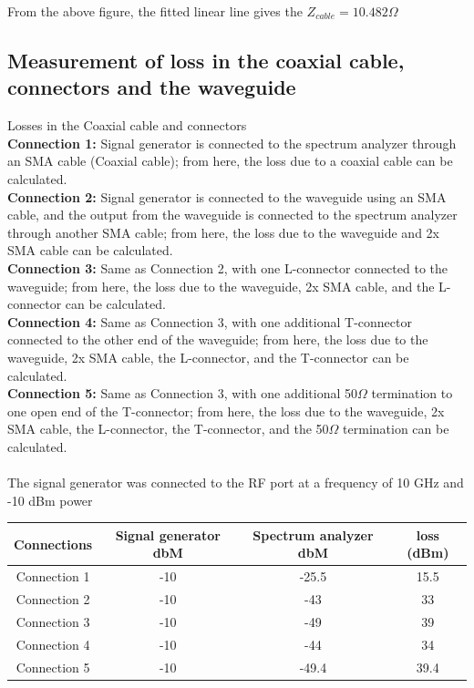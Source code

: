 \documentclass[12pt,a4paper,bold]{thesis}
\theoremstyle{thm}
\theoremstyle{definition}
\begin{document}
From the above figure, the fitted linear line gives the $Z_{cable} = 10.482 \Omega$ 
\subsection{Measurement of loss in the coaxial cable, connectors and the waveguide}
Losses in the Coaxial cable and connectors\\
\textbf{Connection 1:} Signal generator is connected to the spectrum analyzer through an SMA cable (Coaxial cable); from here, the loss due to a coaxial cable can be calculated.\\
\textbf{Connection 2:} Signal generator is connected to the waveguide using an SMA cable, and the output from the waveguide is connected to the spectrum analyzer through another SMA cable; from here, the loss due to the waveguide and 2x SMA cable can be calculated.\\ 
\textbf{Connection 3:} Same as Connection 2, with one L-connector connected to the waveguide; from here, the loss due to the waveguide, 2x SMA cable, and the L-connector can be calculated.\\
\textbf{Connection 4:} Same as Connection 3, with one additional T-connector connected to the other end of the waveguide; from here, the loss due to the waveguide, 2x SMA cable, the L-connector, and the T-connector can be calculated.\\
\textbf{Connection 5:} Same as Connection 3, with one additional 50$\Omega$ termination to one open end of the  T-connector; from here, the loss due to the waveguide, 2x SMA cable, the L-connector, the T-connector, and the 50$\Omega$ termination can be calculated.\\\\
The signal generator was connected to the RF port at a frequency of 10 GHz and -10 dBm power
\begin{center}
\begin{tabular}{||c c c c||} 
 \hline
 Connections & Signal generator dbM & Spectrum analyzer dbM & loss (dBm)\\ [0.5ex] 
 \hline\hline
 Connection 1 & -10 & -25.5 & 15.5\\ 
 Connection 2 & -10 & -43 & 33\\
 Connection 3 & -10 & -49 & 39\\
 Connection 4 & -10 & -44 & 34\\
 Connection 5 & -10 & -49.4 & 39.4\\  [1ex] 
 \hline
\end{tabular}
\end{center}
\end{document}
